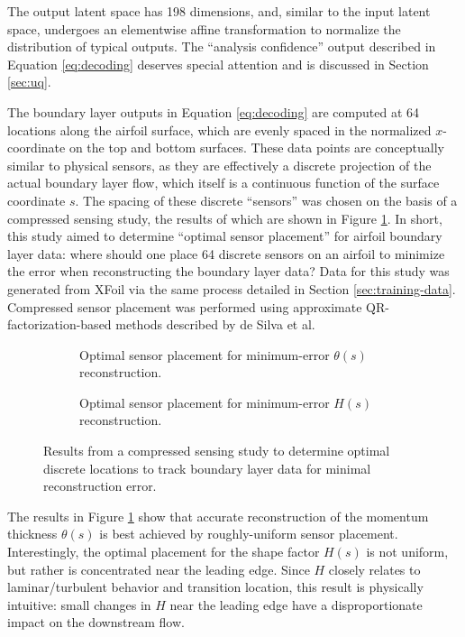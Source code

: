 \documentclass[journal]{new-aiaa}
\begin{document}
The output latent space has 198 dimensions, and, similar to the input latent space, undergoes an elementwise affine transformation to normalize the distribution of typical outputs. The ``analysis confidence'' output described in Equation \ref{eq:decoding} deserves special attention and is discussed in Section \ref{sec:uq}.

The boundary layer outputs in Equation \ref{eq:decoding} are computed at 64 locations along the airfoil surface, which are evenly spaced in the normalized $x$-coordinate on the top and bottom surfaces. These data points are conceptually similar to physical sensors, as they are effectively a discrete projection of the actual boundary layer flow, which itself is a continuous function of the surface coordinate $s$. The spacing of these discrete ``sensors'' was chosen on the basis of a compressed sensing study, the results of which are shown in Figure \ref{fig:optimal_sensor_placement}. In short, this study aimed to determine ``optimal sensor placement'' for airfoil boundary layer data: where should one place 64 discrete sensors on an airfoil to minimize the error when reconstructing the boundary layer data? Data for this study was generated from XFoil via the same process detailed in Section \ref{sec:training-data}. Compressed sensor placement was performed using approximate QR-factorization-based methods described by de Silva et al. \cite{de_Silva2021}

\begin{figure}[H]
    \centering
    \begin{subfigure}[t]{0.49\textwidth}
        \centering
        
        \caption{Optimal sensor placement for minimum-error $\theta(s)$ reconstruction.}
    \end{subfigure}
    \begin{subfigure}[t]{0.49\textwidth}
        \centering
        
        \caption{Optimal sensor placement for minimum-error $H(s)$ reconstruction.}
    \end{subfigure}
    \caption{Results from a compressed sensing study to determine optimal discrete locations to track boundary layer data for minimal reconstruction error.}
    \label{fig:optimal_sensor_placement}
\end{figure}

The results in Figure \ref{fig:optimal_sensor_placement} show that accurate reconstruction of the momentum thickness $\theta(s)$ is best achieved by roughly-uniform sensor placement. Interestingly, the optimal placement for the shape factor $H(s)$ is not uniform, but rather is concentrated near the leading edge. Since $H$ closely relates to laminar/turbulent behavior and transition location, this result is physically intuitive: small changes in $H$ near the leading edge have a disproportionate impact on the downstream flow.
\end{document}
